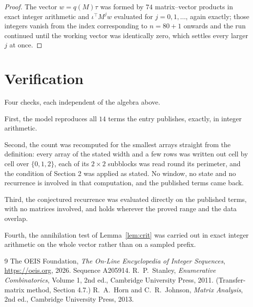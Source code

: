 \documentclass[11pt,a4paper]{article}
\theoremstyle{plain}
\theoremstyle{definition}
\begin{document}
\begin{proof}
The vector $w=q(M)\tau$ was formed by $74$ matrix--vector products in exact integer
arithmetic and $\iota^{\!\top}M^{j}w$ evaluated for $j=0,1,\dots$, again exactly; those
integers vanish from the index corresponding to $n=80+1$ onwards and the run continued
until the working vector was identically zero, which settles every larger $j$ at once.
\end{proof}

\section{Verification}

Four checks, each independent of the algebra above.

First, the model reproduces all $14$ terms the entry publishes, exactly, in integer
arithmetic.

Second, the count was recomputed for the smallest arrays straight from the definition: every
array of the stated width and a few rows was written out cell by cell over $\{0,1,2\}$, each of
its $2\times2$ subblocks was read round its perimeter, and the condition of Section 2 was
applied as stated. No window, no state and no recurrence is involved in that computation, and
the published terms came back.

Third, the conjectured recurrence was evaluated directly on the published terms, with no
matrices involved, and holds wherever the proved range and the data overlap.

Fourth, the annihilation test of Lemma~\ref{lem:crit} was carried out in exact integer
arithmetic on the whole vector rather than on a sampled prefix.

\begin{thebibliography}{9}
 The OEIS Foundation, \emph{The On-Line Encyclopedia of Integer
Sequences}, \url{https://oeis.org}, 2026. Sequence A205914.
 R.~P.~Stanley, \emph{Enumerative Combinatorics}, Volume 1, 2nd ed.,
Cambridge University Press, 2011. (Transfer-matrix method, Section 4.7.)
 R.~A.~Horn and C.~R.~Johnson, \emph{Matrix Analysis}, 2nd ed., Cambridge
University Press, 2013.
\end{thebibliography}
\end{document}

